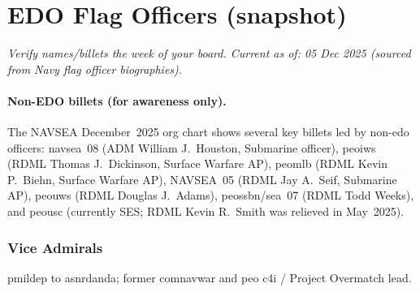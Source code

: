\documentclass[../main.tex]{subfiles}
\begin{document}
\section{EDO Flag Officers (snapshot)}\label{app:edo-flags}
\emph{\footnotesize Verify names/billets the week of your board. Current as of: 05 Dec 2025 (sourced from Navy flag officer biographies).}

\paragraph{Non-EDO billets (for awareness only).} The NAVSEA December~2025 org chart shows several key billets led by non-\ac{edo} officers: \ac{navsea}~08 (ADM William J.\ Houston, Submarine officer), \ac{peoiws} (RDML Thomas J.\ Dickinson, Surface Warfare AP), \ac{peomlb} (RDML Kevin P.\ Biehn, Surface Warfare AP), NAVSEA~05 (RDML Jay A.\ Seif, Submarine AP), \ac{peouws} (RDML Douglas J.\ Adams), \ac{peossbn}/\ac{sea}~07 (RDML Todd Weeks), and \ac{peousc} (currently SES; RDML Kevin R.\ Smith was relieved in May~2025)\autocite{navsea-org-chart-2025}.

\subsubsection*{Vice Admirals}
\begin{description}[style=nextline, labelsep=0.5em, font=\bfseries]
  \item[\textbf{\ac{vadm} Seiko Okano.}]
        \ac{pmildep} to \ac{asnrdanda}; former \ac{comnavwar} and \ac{peo} \ac{c4i} / Project Overmatch lead\autocite{navy-okano-2025}.
\end{description}
\end{document}

